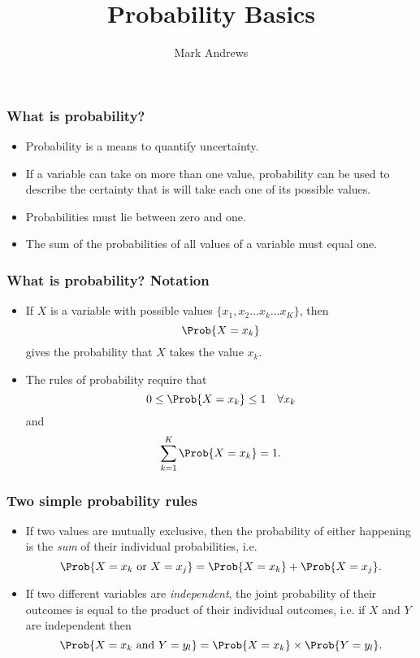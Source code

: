 \documentclass[10pt,xcolor=dvipsnames,serif,professionalfont]{beamer} %
\title[Probability]{Probability Basics}
\author[Andrews]{Mark Andrews}
\date{}
\begin{document}
{
\begin{frame}
   \titlepage
\end{frame}
}
\begin{frame}
\frametitle{What is probability?}
\begin{itemize}
\item Probability is a means to quantify uncertainty.
\item If a variable can take on more than one value, probability can be used to describe the certainty that is will take each one of its possible values.
\item Probabilities must lie between zero and one.
\item The sum of the probabilities of all values of a variable must equal one.
\end{itemize}
\end{frame}

\begin{frame}
\frametitle{What is probability? Notation}
\begin{itemize}
\item If $X$ is a variable with possible values $\{x_1, x_2 \ldots x_k \ldots x_K\}$, then 
\begin{equation}
\Prob{X = x_k} 
\end{equation}
gives the probability that $X$ takes the value $x_k$.
\item The rules of probability require that
\begin{equation}
0 \leq \Prob{X = x_k} \leq 1 \quad \forall x_k 
\end{equation}
and
\begin{equation}
\sum_{k=1}^K \Prob{X = x_k} = 1.
\end{equation}

\end{itemize}
\end{frame}

\begin{frame}
\frametitle{Two simple probability rules}
\begin{itemize}
\item If two values are mutually exclusive, then the probability of either happening is the \emph{sum} of their individual probabilities, i.e.
\begin{equation}
\Prob{X=x_k \ \text{or} \ X=x_j} = \Prob{X=x_k} + \Prob{X=x_j}.
\end{equation}
\item If two different variables are \emph{independent}, the joint probability of their outcomes is equal to the product of their individual outcomes, i.e. if $X$ and $Y$ are independent then
\begin{equation}
\Prob{X=x_k \ \text{and} \ Y=y_l} = \Prob{X=x_k} \times \Prob{Y=y_l}.
\end{equation}
\end{itemize}
\end{frame}
\end{document}
